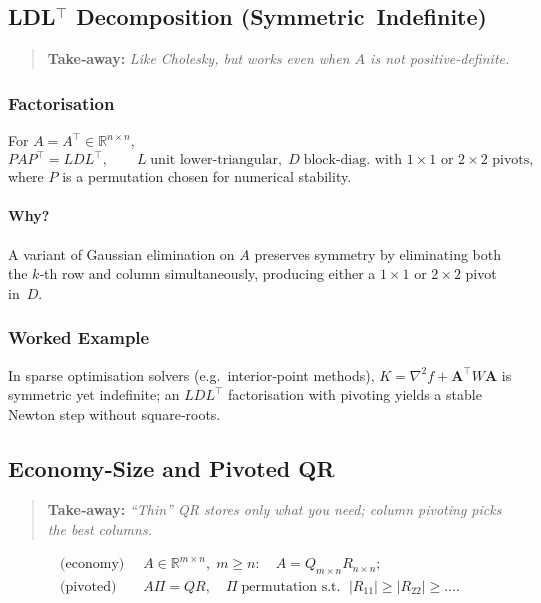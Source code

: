 \subsection{LDL\texorpdfstring{$^\top$}{\^T} Decomposition (Symmetric Indefinite)}
\begin{quote}
\textbf{Take‑away:} \emph{Like Cholesky, but works even when $A$ is not positive‑definite.}
\end{quote}

\subsubsection*{Factorisation}
For $A=A^\top\in\mathbb R^{n\times n}$,
\[
P A P^\top = L D L^\top,\qquad
L\;\text{unit lower‑triangular},\;
D\;\text{block‑diag.\ with $1\times 1$ or $2\times 2$ pivots},
\]
where $P$ is a permutation chosen for numerical stability.

\paragraph{Why?}
A variant of Gaussian elimination on $A$ preserves symmetry by eliminating both the $k$‑th row and column simultaneously, producing either a $1\times1$ or $2\times2$ pivot in~$D$.

\subsubsection*{Worked Example}
In sparse optimisation solvers (e.g.\ interior‑point methods), $K=\nabla^2\!f + \mathbf A^\top W \mathbf A$ is symmetric yet indefinite; an $LDL^\top$ factorisation with pivoting yields a stable Newton step without square‑roots.

\subsection{Economy‑Size and Pivoted QR}
\begin{quote}
\textbf{Take‑away:} \emph{“Thin” QR stores only what you need; column pivoting picks the best columns.}
\end{quote}

\begin{align}
\text{(economy)}\;&\;A\in\mathbb R^{m\times n},\;m\!\ge n:
\quad A = Q_{m\times n} R_{n\times n}; \\[4pt]
\text{(pivoted)}\;&\;A\Pi = Q R,\quad
\Pi\;\text{permutation s.t.\ }\;|R_{11}|\ge|R_{22}|\ge\dots.
\end{align}

